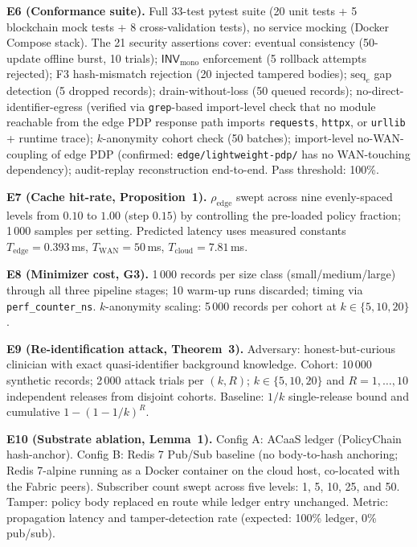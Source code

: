 \documentclass[runningheads]{llncs}
\begin{document}
\noindent\textbf{E6 (Conformance suite).} Full 33-test pytest suite (20 unit tests + 5 blockchain mock tests + 8 cross-validation tests), no service mocking (Docker Compose stack). The 21 security assertions cover: eventual consistency (50-update offline burst, 10 trials); $\mathsf{INV}_{\mathrm{mono}}$ enforcement (5 rollback attempts rejected); F3 hash-mismatch rejection (20 injected tampered bodies); $\mathrm{seq}_e$ gap detection (5 dropped records); drain-without-loss (50 queued records); no-direct-identifier-egress (verified via \texttt{grep}-based import-level check that no module reachable from the edge PDP response path imports \texttt{requests}, \texttt{httpx}, or \texttt{urllib} + runtime trace); $k$-anonymity cohort check (50 batches); import-level no-WAN-coupling of edge PDP (confirmed: \texttt{edge/lightweight-pdp/} has no WAN-touching dependency); audit-replay reconstruction end-to-end. Pass threshold: 100\%.

\noindent\textbf{E7 (Cache hit-rate, Proposition~1).} $\rho_{\mathrm{edge}}$ swept across nine evenly-spaced levels from $0.10$ to $1.00$ (step $0.15$) by controlling the pre-loaded policy fraction; 1\,000 samples per setting. Predicted latency uses measured constants $T_{\mathrm{edge}}=0.393$\,ms, $T_{\mathrm{WAN}}=50$\,ms, $T_{\mathrm{cloud}}=7.81$\,ms.

\noindent\textbf{E8 (Minimizer cost, G3).} 1\,000 records per size class (small/medium/large) through all three pipeline stages; 10 warm-up runs discarded; timing via \texttt{perf\_\allowbreak counter\_\allowbreak ns}. $k$-anonymity scaling: 5\,000 records per cohort at $k \in \{5, 10, 20\}$.

\noindent\textbf{E9 (Re-identification attack, Theorem~3).} Adversary: honest-but-curious clinician with exact quasi-identifier background knowledge. Cohort: 10\,000 synthetic records; 2\,000 attack trials per $(k, R)$; $k \in \{5, 10, 20\}$ and $R = 1, \ldots, 10$ independent releases from disjoint cohorts. Baseline: $1/k$ single-release bound and cumulative $1-(1-1/k)^R$.

\noindent\textbf{E10 (Substrate ablation, Lemma~1).} Config A: ACaaS ledger (PolicyChain hash-anchor). Config B: Redis 7 Pub/Sub baseline (no body-to-hash anchoring; Redis 7-alpine running as a Docker container on the cloud host, co-located with the Fabric peers). Subscriber count swept across five levels: 1, 5, 10, 25, and 50. Tamper: policy body replaced en route while ledger entry unchanged. Metric: propagation latency and tamper-detection rate (expected: 100\% ledger, 0\% pub/sub).
\end{document}
